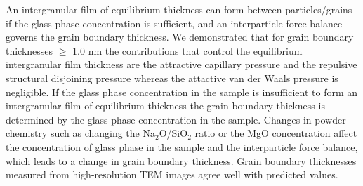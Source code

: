 An intergranular film of equilibrium thickness can form between particles/grains if the glass phase concentration is sufficient, and an interparticle force balance governs the grain boundary thickness. We demonstrated that for grain boundary thicknesses $\geq$ 1.0 nm the contributions that control the equilibrium intergranular film thickness are the attractive capillary pressure and the repulsive structural disjoining pressure whereas the attactive van der Waals pressure is negligible. If the glass phase concentration in the sample is insufficient to form an intergranular film of equilibrium thickness the grain boundary thickness is determined by the glass phase concentration in the sample. Changes in powder chemistry such as changing the Na$_{2}$O/SiO$_{2}$ ratio or the MgO concentration affect the concentration of glass phase in the sample and the interparticle force balance, which leads to a change in grain boundary thickness. Grain boundary thicknesses measured from high-resolution TEM images agree well with predicted values.

